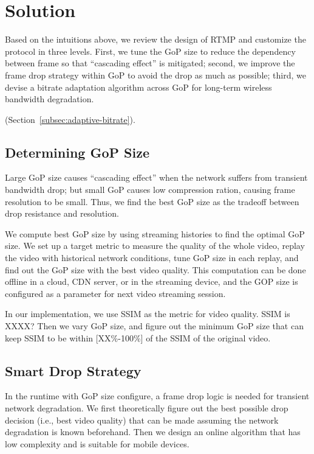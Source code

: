 \newcommand{\Mod}[1]{\text{ (mod } #1\text{)}}
\section{\name Solution}
Based on the intuitions above, we review the design of RTMP and customize the protocol in three levels. First, we tune the GoP size to reduce the dependency between frame so that ``cascading effect'' is mitigated; second, we improve the frame drop strategy within GoP to avoid the drop as much as possible; third, we devise a bitrate adaptation algorithm across GoP for long-term wireless bandwidth degradation.

(Section~\ref{subsec:adaptive-bitrate}).
\subsection{Determining GoP Size}
Large GoP size causes ``cascading effect'' when the network suffers from transient bandwidth drop; but small GoP causes low compression ration, causing frame resolution to be small. Thus, we find the best GoP size as the tradeoff between drop resistance and resolution. 

We compute best GoP size by using streaming histories to find the optimal GoP size. We set up a target metric to measure the quality of the whole video, replay the video with historical network conditions, tune GoP size in each replay, and find out the GoP size with the best video quality. This computation can be done offline in a cloud, CDN server, or in the streaming device, and the GOP size is configured as a parameter for next video streaming session.

In our implementation, we use SSIM  as the metric for video quality. SSIM is XXXX? Then we vary GoP size, and figure out the minimum GoP size that can keep SSIM to be within [XX\%-100\%] of the SSIM of the original video.


\subsection{Smart Drop Strategy}
\label{subsec:drop-strategy}
In the runtime with GoP size configure, a frame drop logic is needed for transient network degradation. We first theoretically figure out the best possible drop decision (i.e., best video quality) that can be made assuming the network degradation is known beforehand. Then we design an online algorithm that has low complexity and is suitable for mobile devices.

